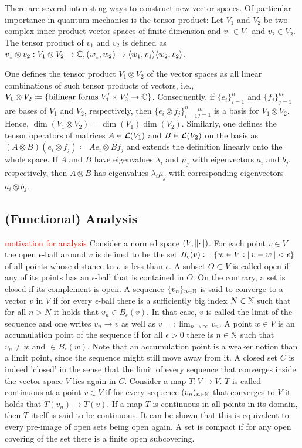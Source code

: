 There are several interesting ways to construct new vector spaces. Of particular importance in quantum mechanics is the tensor product: Let $V_1$ and $V_2$ be two complex inner product vector spaces of finite dimension and $v_1\in V_1$ and $v_2 \in V_2$. The tensor product of $v_1$ and $v_2$ is defined as $v_1 \otimes v_2: V_1 \otimes V_2 \rightarrow \mathbb{C}, (w_1,w_2) \mapsto \langle w_1,v_1\rangle \langle w_2, v_2\rangle$. 

One defines the tensor product $V_1 \otimes V_2$ of the vector spaces as all linear combinations of such tensor products of vectors, i.e., $V_1 \otimes V_2 \coloneqq \{\text{bilinear forms }V_1'\times V_2' \rightarrow \mathbb{C}\}$. Consequently, if $\{e_i\}_{i=1}^n$ and $\{f_j\}_{j=1}^m$ are bases of $V_1$ and $V_2$, respectively, then $\{e_i \otimes f_j\}_{i=1}^n {}_{j=1}^m$ is a basis for $V_1 \otimes V_2$. Hence, $\dim(V_1 \otimes V_2) = \dim(V_1)\dim(V_2)$. Similarly, one defines the tensor operators of matrices $A \in \mathcal{L}(V_1)$ and $B \in \mathcal{L}(V_2)$ on the basis as $(A \otimes B)(e_i\otimes f_j) \coloneqq Ae_i \otimes Bf_j$ and extends the definition linearly onto the whole space. If $A$ and $B$ have eigenvalues $\lambda_i$ and $\mu_j$ with eigenvectors $a_i$ and $b_j$, respectively, then $A \otimes B$ has eigenvalues $\lambda_i \mu_j$ with corresponding eigenvectors $a_i \otimes b_j$.

\subsection{(Functional) Analysis}
\textcolor{red}{motivation for analysis} Consider a normed space $(V, \lVert\cdot\rVert)$. For each point $v \in V$ the open $\epsilon$-ball around $v$ is defined to be the set $B_\epsilon(v):= \{w \in V: \lVert v-w\rVert<\epsilon\}$ of all points whose distance to $v$ is less than $\epsilon$. A subset $O \subset V$ is called open if any of its points has an $\epsilon$-ball that is contained in $O$. On the contrary, a set is closed if its complement is open. A sequence $\{v_n\}_{n \in \mathbb{N}}$ is said to converge to a vector $v$ in $V$ if for every $\epsilon$-ball there is a sufficiently big index $N \in \mathbb{N}$ such that for all $n>N$ it holds that $v_n \in B_\epsilon(v)$. In that case, $v$ is called the limit of the sequence and one writes $v_n \to v$ as well as $v=:\lim_{n \to \infty} v_n$. A point $w \in V$ is an accumulation point of the sequence if for all $\epsilon > 0$ there is $n \in \mathbb{N}$ such that $v_n \neq w$ and $ \in B_\epsilon(w) $. Note that an accumulation point is a weaker notion than a limit point, since the sequence might still move away from it. A closed set $C$ is indeed 'closed' in the sense that the limit of every sequence that converges inside the vector space $V$ lies again in $C$. Consider a map $T: V \rightarrow V$. $T$ is called continuous at a point $v \in V$ if for every sequence $(v_n)_{n\in \mathbb{N}}$ that converges to $V$ it holds that $T(v_n) \to T(v)$. If a map $T$ is continuous in all points in its domain, then $T$ itself is said to be continuous. It can be shown that this is equivalent to every pre-image of open sets being open again. A set is compact if for any open covering of the set there is a finite open subcovering.

